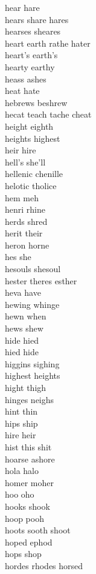 hear hare\\
hears share hares\\
hearses sheares\\
heart earth rathe hater\\
heart's earth's\\
hearty earthy\\
heass ashes\\
heat hate\\
hebrews beshrew\\
hecat teach tache cheat\\
height eighth\\
heights highest\\
heir hire\\
hell's she'll\\
hellenic chenille\\
helotic tholice\\
hem meh\\
henri rhine\\
herds shred\\
herit their\\
heron horne\\
hes she\\
hesouls shesoul\\
hester theres esther\\
heva have\\
hewing whinge\\
hewn when\\
hews shew\\
hide hied\\
hied hide\\
higgins sighing\\
highest heights\\
hight thigh\\
hinges neighs\\
hint thin\\
hips ship\\
hire heir\\
hist this shit\\
hoarse ashore\\
hola halo\\
homer moher\\
hoo oho\\
hooks shook\\
hoop pooh\\
hoots sooth shoot\\
hoped ephod\\
hops shop\\
hordes rhodes horsed\\
